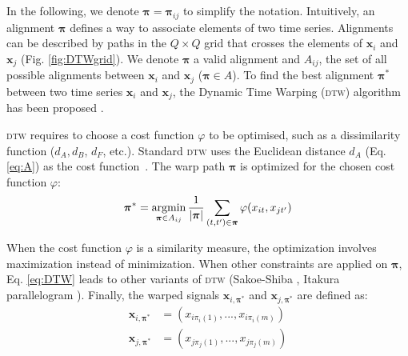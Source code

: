 In the following, we denote $\boldsymbol{\pi}=\boldsymbol{\pi}_{ij}$ to simplify the notation. Intuitively, an alignment $\boldsymbol{\pi}$ defines a way to associate elements of two time series. Alignments can be described by paths in the $Q \times Q$ grid that crosses the elements of $\textbf{x}_i$ and $\textbf{x}_j$ (Fig. \ref{fig:DTWgrid}). We denote $\boldsymbol{\pi}$ a valid alignment and $A_{ij}$, the set of all possible alignments between $\textbf{x}_i$ and $\textbf{x}_j$ ($\boldsymbol{\pi} \in A$). To find the best alignment $\boldsymbol{\pi}^*$ between two time series $\textbf{x}_i$ and $\textbf{x}_j$, the Dynamic Time Warping (\textsc{dtw}) algorithm has been proposed \cite{Keogh2004,Salvador}.

\textsc{dtw} requires to choose a cost function $\varphi$ to be optimised, such as a dissimilarity function ($d_A, d_B$, $d_F$, etc.). Standard \textsc{dtw} uses the Euclidean distance $d_A$ (Eq. \ref{eq:A}) as the cost function~\cite{Berndt1994a}. The warp path $\boldsymbol{\pi}$ is optimized for the chosen cost function $\varphi$:
\begin{equation}
\boldsymbol{\pi}^* = \argmin_{\boldsymbol{\pi} \in A_{ij}} \frac{1}{|\boldsymbol{\pi}|}
\sum_{(t,t') \in \boldsymbol{\pi}} \varphi(x_{it}, x_{jt'})
\label{eq:DTW}
\end{equation}

\noindent When the cost function $\varphi$ is a similarity measure, the optimization involves maximization instead of minimization. When other constraints are applied on $\boldsymbol{\pi}$, Eq. \eqref{eq:DTW} leads to other variants of \textsc{dtw} (Sakoe-Shiba \cite{Sakoe1978a}, Itakura parallelogram \cite{Rabiner1993}). Finally, the warped signals $\textbf{x}_{i,\boldsymbol{\pi}^*}$ and $\textbf{x}_{j,\boldsymbol{\pi}^*}$ are defined as:
\begin{align}
\textbf{x}_{i,\boldsymbol{\pi}^*} 
&= (x_{i\pi_i(1)}, ..., 
x_{i\pi_i(m)}) 			\\	
\textbf{x}_{j,\boldsymbol{\pi}^*} 
&= (x_{j\pi_j(1)}, ..., 
x_{j\pi_j(m)}) 	
\end{align}

